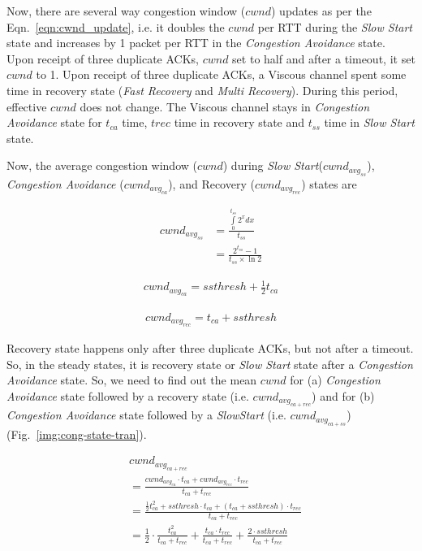 Now, there are several way congestion window ($cwnd$) updates as per the Eqn.~\ref{eqn:cwnd_update}, i.e. it doubles the $cwnd$ per RTT during the {\it Slow Start} state and increases by 1 packet per RTT in the {\it Congestion Avoidance} state. Upon receipt of three duplicate ACKs, $cwnd$ set to half and after a timeout, it set $cwnd$ to 1.
Upon receipt of three duplicate ACKs, a Viscous channel spent some time in recovery state ({\it Fast Recovery} and {\it Multi Recovery}). During this period, effective $cwnd$ does not change. The Viscous channel stays in {\it Congestion Avoidance} state for $t_{ca}$ time, $t{rec}$ time in recovery state and $t_{ss}$ time in {\it Slow Start} state.


Now, the average congestion window ($cwnd$) during {\it Slow Start}($cwnd_{avg_{ss}}$), {\it Congestion Avoidance} ($cwnd_{avg_{ca}}$), and Recovery ($cwnd_{avg_{rec}}$) states are

\begin{equation}
\begin{split}
cwnd_{avg_{ss}} &= \frac{\int\limits_{0}^{t_{ss}} 2^x dx}{t_{ss}} \\
&= \frac{2^{t_{ss}}-1}{t_{ss} \times \ln{2}}
\end{split}
\end{equation}

\begin{equation}
\begin{split}
cwnd_{avg_{ca}} = ssthresh + \frac{1}{2}t_{ca}
\end{split}
\end{equation}

\begin{equation}
\begin{split}
	cwnd_{avg_{rec}} = t_{ca}+ssthresh
\end{split}
\end{equation}

Recovery state happens only after three duplicate ACKs, but not after a timeout. So, in the steady states, it is recovery state or {\it Slow Start} state after a {\it Congestion Avoidance} state. So, we need to find out the mean $cwnd$ for (a) {\it Congestion Avoidance} state followed by a recovery state (i.e. $cwnd_{avg_{ca+rec}}$) and for (b) {\it Congestion Avoidance} state followed by a {\it SlowStart} (i.e. $cwnd_{avg_{ca+ss}}$) (Fig.~\ref{img:cong-state-tran}).

\begin{equation}
\begin{split}
&cwnd_{avg_{ca+rec}} \\
&= \frac{cwnd_{avg_{ca}} \cdot t_{ca} + cwnd_{avg_{rec}} \cdot t_{rec}} {t_{ca} + t_{rec}} \\
&= \frac{\frac{1}{2} t_{ca}^2+ssthresh \cdot t_{ca} + (t_{ca}+ssthresh) \cdot t_{rec}}{t_{ca} + t_{rec}} \\
&= \frac{1}{2} \cdot \frac{t_{ca}^2}{t_{ca} + t_{rec}} + \frac{t_{ca} \cdot t_{rec}}{t_{ca} + t_{rec}} + \frac{2 \cdot ssthresh}{t_{ca} + t_{rec}}
\end{split}
\end{equation}

